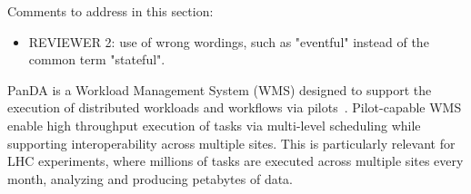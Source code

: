 \ifreview
Comments to address in this section:
\begin{itemize}
	\color{red} 
	\item REVIEWER 2: use of wrong wordings, such as "eventful" instead of
	the common term "stateful".
\end{itemize}
\fi

PanDA is a Workload Management System (WMS) %
designed to support the execution of distributed workloads and workflows via
pilots~\cite{turilli2015comprehensive}. Pilot-capable WMS enable high
throughput execution of tasks via multi-level scheduling while supporting
interoperability across multiple sites. This is particularly relevant for LHC
experiments, where millions of tasks are executed across multiple sites every
month, analyzing and producing petabytes of data. 






